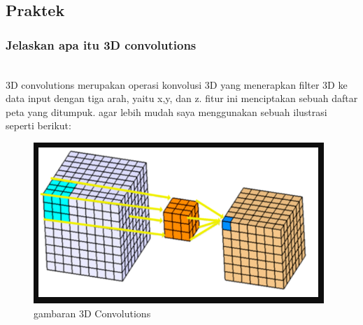 \subsection{Praktek}
\subsubsection{Jelaskan apa itu 3D convolutions}
\hfill\\
3D convolutions merupakan operasi konvolusi 3D yang menerapkan filter 3D ke data input dengan tiga arah, yaitu x,y, dan z. fitur ini menciptakan sebuah daftar peta yang ditumpuk. agar lebih mudah saya menggunakan sebuah ilustrasi seperti berikut:
\begin{figure}[H]
	\centering
	\includegraphics[scale=0.5]{figures/1174083/figures8/p1.png}
	\caption{gambaran 3D Convolutions}
\end{figure}

